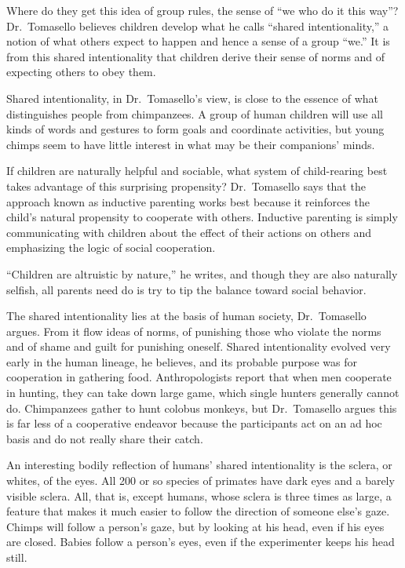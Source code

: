 ﻿\documentclass[12pt]{article}
\begin{document}
Where do they get this idea of group rules, the sense of ``we who do it this way''? Dr.~Tomasello
believes children develop what he calls ``shared intentionality,'' a notion of what others expect to
happen and hence a sense of a group ``we.'' It is from this shared intentionality that children
derive their sense of norms and of expecting others to obey them.

Shared intentionality, in Dr.~Tomasello's view, is close to the essence of what distinguishes people
from chimpanzees. A group of human children will use all kinds of words and gestures to form goals
and coordinate activities, but young chimps seem to have little interest in what may be their
companions' minds.

If children are naturally helpful and sociable, what system of child-rearing best takes advantage of
this surprising propensity? Dr.~Tomasello says that the approach known as inductive parenting works
best because it reinforces the child's natural propensity to cooperate with others. Inductive
parenting is simply communicating with children about the effect of their actions on others and
emphasizing the logic of social cooperation.

``Children are altruistic by nature,'' he writes, and though they are also naturally selfish, all
parents need do is try to tip the balance toward social behavior.

The shared intentionality lies at the basis of human society, Dr.~Tomasello argues. From it flow
ideas of norms, of punishing those who violate the norms and of shame and guilt for punishing
oneself. Shared intentionality evolved very early in the human lineage, he believes, and its
probable purpose was for cooperation in gathering food. Anthropologists report that when men
cooperate in hunting, they can take down large game, which single hunters generally cannot do.
Chimpanzees gather to hunt colobus monkeys, but Dr.~Tomasello argues this is far less of a
cooperative endeavor because the participants act on an ad hoc basis and do not really share their
catch.

An interesting bodily reflection of humans' shared intentionality is the sclera, or whites, of the
eyes. All 200 or so species of primates have dark eyes and a barely visible sclera. All, that is,
except humans, whose sclera is three times as large, a feature that makes it much easier to follow
the direction of someone else's gaze. Chimps will follow a person's gaze, but by looking at his
head, even if his eyes are closed. Babies follow a person's eyes, even if the experimenter keeps his
head still.
\end{document}
